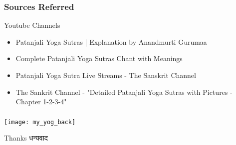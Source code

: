 \begin{frame}[fragile]\frametitle{Sources Referred}

Youtube Channels

	\begin{itemize}
	\item Patanjali Yoga Sutras | Explanation by Anandmurti Gurumaa
	\item Complete Patanjali Yoga Sutras Chant with Meanings
	\item Patanjali Yoga Sutra Live Streams - The Sanskrit Channel
	\item The Sankrit Channel - "Detailed Patanjali Yoga Sutras with Pictures - Chapter 1-2-3-4"
	\end{itemize}

\end{frame}

\begin{frame}[fragile]\frametitle{}

\begin{center}
\texttt{[image: my\_yog\_back]}

Thanks धन्यवाद
\end{center}

\end{frame}
